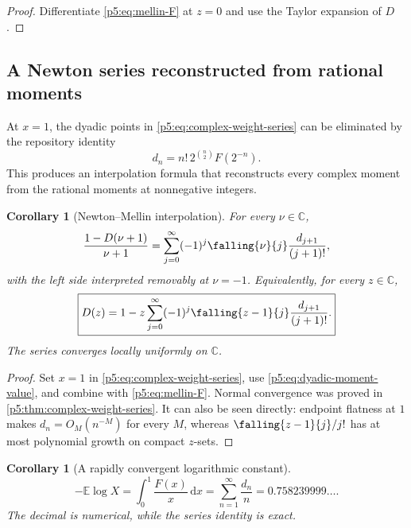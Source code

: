 \documentclass[11pt,oneside]{article}
\newtheorem{corollary}[theorem]{Corollary}
\theoremstyle{definition}
\theoremstyle{remark}
\newcommand{\E}{\mathbb E}
\newcommand{\C}{\mathbb C}
\newcommand{\dd}{\,\mathrm d}
\newcommand{\1}{\mathbf 1}
\begin{document}
\begin{proof}
Differentiate \eqref{p5:eq:mellin-F} at $z=0$ and use the Taylor expansion of $D$.
\end{proof}

\subsection{A Newton series reconstructed from rational moments}

At $x=1$, the dyadic points in \eqref{p5:eq:complex-weight-series} can be eliminated by the repository identity
\begin{equation}\label{p5:eq:dyadic-moment-value}
 d_n=n!\,2^{\binom n2}F(2^{-n}).
\end{equation}
This produces an interpolation formula that reconstructs every complex moment from the rational moments at nonnegative integers.

\begin{corollary}[Newton--Mellin interpolation]\label{p5:cor:newton-mellin}
For every $\nu\in\C$,
\begin{equation}\label{p5:eq:newton-MF}
 \frac{1-D(\nu+1)}{\nu+1}
 =\sum_{j=0}^{\infty}(-1)^j\falling{\nu}{j}
 \frac{d_{j+1}}{(j+1)!},
\end{equation}
with the left side interpreted removably at $\nu=-1$.  Equivalently, for every $z\in\C$,
\begin{equation}\label{p5:eq:newton-D}
\boxed{
 D(z)=1-z\sum_{j=0}^{\infty}(-1)^j
 \falling{z-1}{j}\frac{d_{j+1}}{(j+1)!}.}
\end{equation}
The series converges locally uniformly on $\C$.
\end{corollary}

\begin{proof}
Set $x=1$ in \eqref{p5:eq:complex-weight-series}, use \eqref{p5:eq:dyadic-moment-value}, and combine with \eqref{p5:eq:mellin-F}.  Normal convergence was proved in \cref{p5:thm:complex-weight-series}.  It can also be seen directly: endpoint flatness at $1$ makes $d_n=O_M(n^{-M})$ for every $M$, whereas $\falling{z-1}{j}/j!$ has at most polynomial growth on compact $z$-sets.
\end{proof}

\begin{corollary}[A rapidly convergent logarithmic constant]\label{p5:cor:log-constant-series}
\begin{equation}\label{p5:eq:log-constant-series}
 -\E\log X
 =\int_0^1\frac{F(x)}x\dd x
 =\sum_{n=1}^{\infty}\frac{d_n}{n}
 =0.758239999\ldots .
\end{equation}
The decimal is numerical, while the series identity is exact.
\end{corollary}
\end{document}
